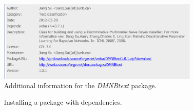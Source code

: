 \begin{figure}[!th]
\centering
\includegraphics[width=0.9\textwidth]{images/P3.png}
\caption{Additional information for the \textit{DMNBtext} package.}
\label{fig:package_manager_3}
\end{figure}

\begin{figure}[!th]
\centering
{}
\qquad
{}
\caption{\label{fig:package_manager_4}Installing a package with dependencies.}
\end{figure}


